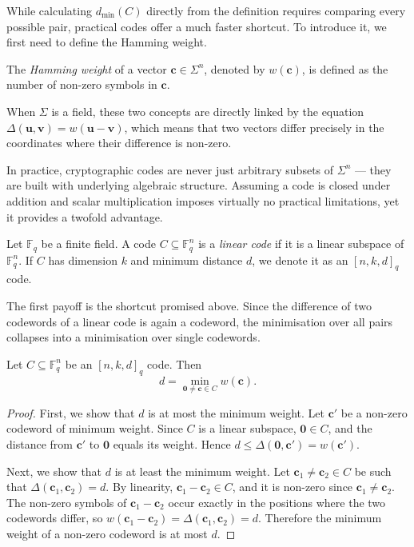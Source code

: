 \documentclass[../../book]{subfiles}
\begin{document}
While calculating $d_{\min}(C)$ directly from the definition requires comparing every possible pair, practical codes offer a much faster shortcut. To introduce it, we first need to define the Hamming weight.

\begin{definition}\label{def:hamming-weight}
  The \emph{Hamming weight} of a vector $\mathbf{c} \in \Sigma^n$, denoted by $w(\mathbf{c})$, is defined as the number of non-zero symbols in $\mathbf{c}$.
\end{definition}

When $\Sigma$ is a field, these two concepts are directly linked by the equation $\Delta(\mathbf{u}, \mathbf{v}) = w(\mathbf{u} - \mathbf{v})$, which means that two vectors differ precisely in the coordinates where their difference is non-zero. 

In practice, cryptographic codes are never just arbitrary subsets of $\Sigma^n$ --- they are built with underlying algebraic structure. Assuming a code is closed under addition and scalar multiplication imposes virtually no practical limitations, yet it provides a twofold advantage.

\begin{definition}\label{def:linear-code}
  Let $\mathbb{F}_q$ be a finite field. A code $C \subseteq \mathbb{F}_q^n$ is a \emph{linear code} if it is a linear subspace of $\mathbb{F}_q^n$. If $C$ has dimension $k$ and minimum distance $d$, we denote it as an $[n,k,d]_q$ code.
\end{definition}

The first payoff is the shortcut promised above. Since the difference of two codewords of a linear code is again a codeword, the minimisation over all pairs collapses into a minimisation over single codewords.

\begin{proposition}\label{prop:dist-eq-weight}
  Let $C \subseteq \mathbb{F}_q^n$ be an $[n,k,d]_q$ code. Then
  \begin{equation*}
    d = \min_{\mathbf{0} \neq \mathbf{c} \in C} w(\mathbf{c}).
  \end{equation*}
\end{proposition}

\begin{proof}
  First, we show that $d$ is at most the minimum weight. Let $\mathbf{c}'$ be a non-zero codeword of minimum weight. Since $C$ is a linear subspace, $\mathbf{0} \in C$, and the distance from $\mathbf{c}'$ to $\mathbf{0}$ equals its weight. Hence $d \leq \Delta(\mathbf{0}, \mathbf{c}') = w(\mathbf{c}')$.

  Next, we show that $d$ is at least the minimum weight. Let $\mathbf{c}_1 \neq \mathbf{c}_2 \in C$ be such that $\Delta(\mathbf{c}_1, \mathbf{c}_2) = d$. By linearity, $\mathbf{c}_1 - \mathbf{c}_2 \in C$, and it is non-zero since $\mathbf{c}_1 \neq \mathbf{c}_2$. The non-zero symbols of $\mathbf{c}_1 - \mathbf{c}_2$ occur exactly in the positions where the two codewords differ, so $w(\mathbf{c}_1 - \mathbf{c}_2) = \Delta(\mathbf{c}_1, \mathbf{c}_2) = d$. Therefore the minimum weight of a non-zero codeword is at most $d$.
\end{proof}
\end{document}
